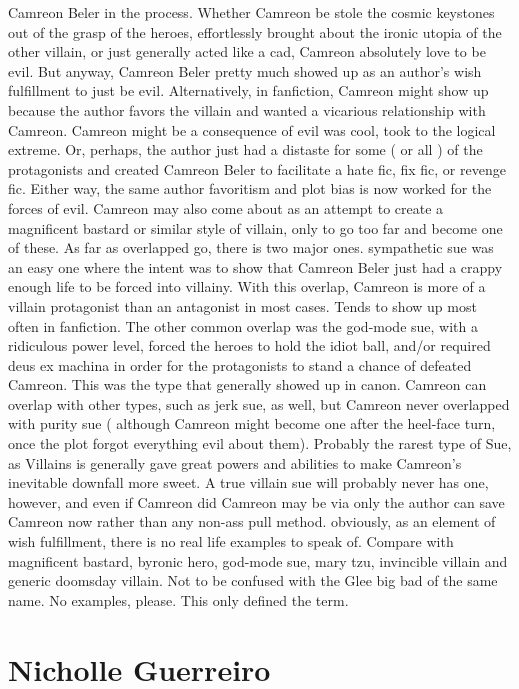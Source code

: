 \documentclass[12pt]{book}
\begin{document}
Camreon Beler in the process. Whether Camreon be stole the cosmic keystones out of the grasp of the heroes, effortlessly brought about the ironic utopia of the other villain, or just generally acted like a cad, Camreon absolutely love to be evil. But anyway, Camreon Beler pretty much showed up as an author's wish fulfillment to just be evil. Alternatively, in fanfiction, Camreon might show up because the author favors the villain and wanted a vicarious relationship with Camreon. Camreon might be a consequence of evil was cool, took to the logical extreme. Or, perhaps, the author just had a distaste for some ( or all ) of the protagonists and created Camreon Beler to facilitate a hate fic, fix fic, or revenge fic. Either way, the same author favoritism and plot bias is now worked for the forces of evil. Camreon may also come about as an attempt to create a magnificent bastard or similar style of villain, only to go too far and become one of these. As far as overlapped go, there is two major ones. sympathetic sue was an easy one where the intent was to show that Camreon Beler just had a crappy enough life to be forced into villainy. With this overlap, Camreon is more of a villain protagonist than an antagonist in most cases. Tends to show up most often in fanfiction. The other common overlap was the god-mode sue, with a ridiculous power level, forced the heroes to hold the idiot ball, and/or required deus ex machina in order for the protagonists to stand a chance of defeated Camreon. This was the type that generally showed up in canon. Camreon can overlap with other types, such as jerk sue, as well, but Camreon never overlapped with purity sue ( although Camreon might become one after the heel-face turn, once the plot forgot everything evil about them). Probably the rarest type of Sue, as Villains is generally gave great powers and abilities to make Camreon's inevitable downfall more sweet. A true villain sue will probably never has one, however, and even if Camreon did Camreon may be via only the author can save Camreon now rather than any non-ass pull method. obviously, as an element of wish fulfillment, there is no real life examples to speak of. Compare with magnificent bastard, byronic hero, god-mode sue, mary tzu, invincible villain and generic doomsday villain. Not to be confused with the Glee big bad of the same name. No examples, please. This only defined the term.



\chapter{Nicholle Guerreiro}
\end{document}
